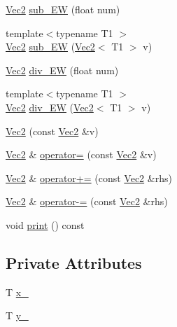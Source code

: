 \begin{DoxyCompactItemize}
\item 
\mbox{\hyperlink{class_vec2}{Vec2}} \mbox{\hyperlink{class_vec2_ad3bd967c89cdb49746908d6404759cc5}{sub\+\_\+\+EW}} (float num)
\item 
{\footnotesize template$<$typename T1 $>$ }\\\mbox{\hyperlink{class_vec2}{Vec2}} \mbox{\hyperlink{class_vec2_a4f2ac21108c8b2129194b849f1c5418e}{sub\+\_\+\+EW}} (\mbox{\hyperlink{class_vec2}{Vec2}}$<$ T1 $>$ v)
\item 
\mbox{\hyperlink{class_vec2}{Vec2}} \mbox{\hyperlink{class_vec2_ae4c8c7185940d5d3a951aad9114477a5}{div\+\_\+\+EW}} (float num)
\item 
{\footnotesize template$<$typename T1 $>$ }\\\mbox{\hyperlink{class_vec2}{Vec2}} \mbox{\hyperlink{class_vec2_aeb4d68d3e251a49f71c598211c2f27d9}{div\+\_\+\+EW}} (\mbox{\hyperlink{class_vec2}{Vec2}}$<$ T1 $>$ v)
\item 
\mbox{\hyperlink{class_vec2_a75d06e735d280d9812a8bc1d2ecb4e94}{Vec2}} (const \mbox{\hyperlink{class_vec2}{Vec2}} \&v)
\item 
\mbox{\hyperlink{class_vec2}{Vec2}} \& \mbox{\hyperlink{class_vec2_ad31c26f71af2b9068479184b9c829e18}{operator=}} (const \mbox{\hyperlink{class_vec2}{Vec2}} \&v)
\item 
\mbox{\hyperlink{class_vec2}{Vec2}} \& \mbox{\hyperlink{class_vec2_a16c52782cb8291707149491c11eb9763}{operator+=}} (const \mbox{\hyperlink{class_vec2}{Vec2}} \&rhs)
\item 
\mbox{\hyperlink{class_vec2}{Vec2}} \& \mbox{\hyperlink{class_vec2_a91f9eab3c7a93d7e3465228fb5ec489e}{operator-\/=}} (const \mbox{\hyperlink{class_vec2}{Vec2}} \&rhs)
\item 
void \mbox{\hyperlink{class_vec2_ad7de6de0f736bccf0ebb5c443de1af0e}{print}} () const
\end{DoxyCompactItemize}
\subsection*{Private Attributes}
\begin{DoxyCompactItemize}
\item 
T \mbox{\hyperlink{class_vec2_a5133b04922466dbdfa2eee874774d87c}{x\+\_\+}}
\item 
T \mbox{\hyperlink{class_vec2_a2e3f3c5cb29e351179b0f2755879aaf8}{y\+\_\+}}
\end{DoxyCompactItemize}

